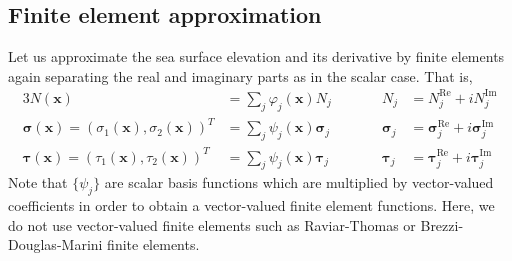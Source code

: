\documentclass[11pt,a4paper]{article}
\begin{document}
\subsection{Finite element approximation}
Let us approximate the sea surface elevation and its derivative by finite elements again separating the real and imaginary parts as in the scalar case. That is,
\begin{alignat}{3}
N(\mathbf{x})&=\sum_{j}\varphi_j(\mathbf{x})N_j && \qquad N_j&=N_j^\mathrm{Re}+iN_j^\mathrm{Im}\\
\boldsymbol{\sigma}(\mathbf{x})=(\sigma_1(\mathbf{x}),\sigma_2(\mathbf{x}))^T&=\sum_{j}\psi_j(\mathbf{x})\boldsymbol{\sigma}_j && \qquad \boldsymbol{\sigma}_j&=\boldsymbol{\sigma}_j^\mathrm{Re}+i\boldsymbol{\sigma}_j^\mathrm{Im}\\
\boldsymbol{\tau}(\mathbf{x})=(\tau_1(\mathbf{x}),\tau_2(\mathbf{x}))^T&=\sum_{j}\psi_j(\mathbf{x})\boldsymbol{\tau}_j && \qquad \boldsymbol{\tau}_j&=\boldsymbol{\tau}_j^\mathrm{Re}+i\boldsymbol{\tau}_j^\mathrm{Im}
\end{alignat}
Note that $\{\psi_j\}$ are scalar basis functions which are multiplied by vector-valued coefficients in order to obtain a vector-valued finite element functions. Here, we do not use vector-valued finite elements such as Raviar-Thomas or Brezzi-Douglas-Marini finite elements.
\end{document}

